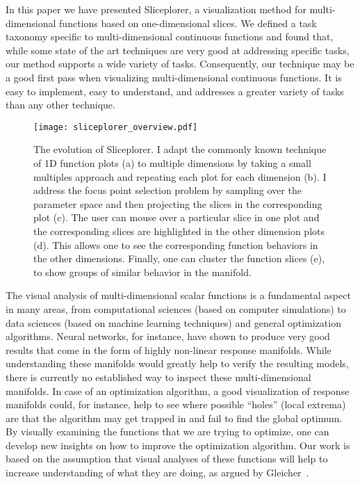 


In this paper we have presented Sliceplorer, a visualization method for
multi-dimensional functions based on one-dimensional slices. We defined a task
taxonomy specific to multi-dimensional continuous functions and found that,
while some state of the art techniques are very good at  addressing specific
tasks, our method supports a wide variety of tasks. Consequently, our technique
may be a good first pass when visualizing multi-dimensional continuous functions. 
It is easy to implement, easy to understand, and addresses a greater variety
of tasks than any other technique. 

\begin{figure}
  \centering
  \texttt{[image: sliceplorer\_overview.pdf]}
  \caption[The evolution of Sliceplorer.]{%
    The evolution of Sliceplorer. I adapt the commonly known technique of
    1D function plots (a) to
    multiple dimensions by taking a small multiples approach and repeating each
    plot for each dimension (b). I address the
    focus point selection problem by sampling over the parameter space and then
    projecting the slices in the corresponding plot
    (c). The user can mouse over a particular
    slice in one plot and the corresponding slices are highlighted in the other
    dimension plots (d). This allows one to
    see the corresponding function behaviors in the other dimensions.  Finally,
    one can cluster the function slices (e), to
    show groups of similar behavior in the manifold.
  }
  \label{fig:walkthrough}
\end{figure}


The visual analysis of multi-dimensional scalar functions is a fundamental aspect in many areas, from computational sciences (based on computer simulations) to data sciences (based on machine learning techniques) and general optimization algorithms. 
Neural networks, for instance, have shown to produce very good results that come in the form of highly non-linear response manifolds.
While understanding these manifolds would greatly help to verify
the resulting models, there
is currently no established way to inspect these multi-dimensional manifolds. 
In case of an optimization algorithm, a good visualization of response manifolds could, for instance, help to see where possible
``holes'' (local extrema) are that the algorithm may get trapped in and fail to find the
global optimum. By visually examining the functions that we are trying to
optimize, one can develop new insights on how to improve the optimization
algorithm. Our work is based on the assumption that visual analyses of these functions will help to increase
understanding of what they are doing, 
as argued by Gleicher~\cite{gleicher:2016}.

